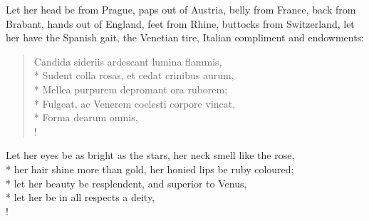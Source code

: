 Let her head be from Prague, paps out of Austria, belly from
France, back from Brabant, hands out of England, feet from Rhine,
buttocks from Switzerland, let her have the Spanish gait, the Venetian
tire, Italian compliment and endowments:
%
\begin{latin}%
\begin{verse}%
Candida sideriis ardescant lumina flammis,\\*
Sudent colla rosas, et cedat crinibus aurum,\\*
Mellea purpurem depromant ora ruborem;\\*
Fulgeat, ac Venerem coelesti corpore vincat,\\*
Forma dearum omnis, \etc{}\\!
\end{verse}%
\end{latin}%
\translationrule%
Let her eyes be as bright as the stars, her neck smell like the rose,\\*
her hair shine more than gold, her honied lips be ruby coloured;\\*
let her beauty be resplendent, and superior to Venus,\\*
let her be in all respects a deity, \etc{}\\!
%

